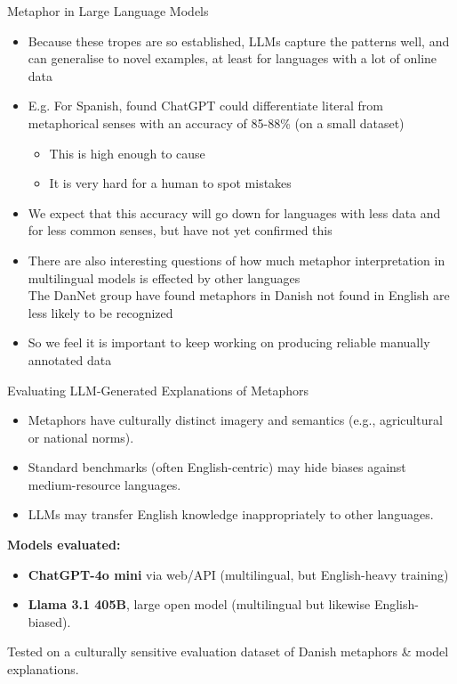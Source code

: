 \documentclass[dvipsnames]{beamer}
\begin{document}
\begin{frame}{Metaphor in Large Language Models}
  \begin{itemize}
  \item Because these tropes are so established, LLMs capture the
    patterns well, and can generalise to novel examples, at least for languages with a lot of online data
  \item E.g. For Spanish, \citet{puraivan2024metaphor} found ChatGPT
    could differentiate literal from metaphorical senses with an
    accuracy of 85-88\% (on a small dataset)
    \begin{itemize}
    \item This is high enough to cause 
    \item It is very hard for a human to spot mistakes
    \end{itemize}
  \item We expect that this accuracy will go down for languages with
    less data and for less common senses, but have not yet confirmed
    this
  \item There are also interesting questions of how much metaphor
    interpretation in multilingual models is effected by other languages
    \\ The DanNet group have found metaphors in Danish not found in English are less likely to be recognized
  \item So we feel it is important to
    keep working on producing reliable
    manually annotated data
  \end{itemize}%

 \end{frame}

 \begin{frame}{Evaluating LLM-Generated Explanations of Metaphors
     \citep{Pedersen:Soerensen:Nimb:Hansen:Olsen:Al-Laith:2025} }

\begin{itemize}
  \item Metaphors have culturally distinct imagery and semantics (e.g., agricultural or national norms).
  \item Standard benchmarks (often English-centric) may hide biases against medium-resource languages.
  \item  LLMs may transfer English knowledge inappropriately to other languages.
\end{itemize}

\smallskip
\textbf{Models evaluated:}
\begin{itemize}
  \item \textbf{ChatGPT-4o mini} via web/API (multilingual, but English-heavy training)
  \item \textbf{Llama 3.1 405B}, large open model (multilingual but likewise English-biased).
\end{itemize}

\smallskip
Tested on a  culturally sensitive evaluation dataset of Danish metaphors \& model explanations.
\end{frame}
\end{document}
